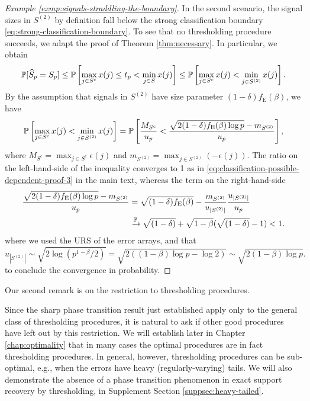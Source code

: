 \begin{example}
\begin{proof}[Example \ref{exmp:signals-straddling-the-boundary}]
In the second scenario, the signal sizes in $S^{(2)}$ by definition fall below the strong classification boundary \eqref{eq:strong-classification-boundary}.
To see that no thresholding procedure succeeds, we adapt the proof of Theorem \ref{thm:necessary}.
In particular, we obtain
$$
    \P[\widehat{S}_p = S_p] 
    \le \P\left[\max_{j\in S^c}x(j) \le t_p < \min_{j\in S}x(j)\right]
    \le \P\left[\max_{j\in S^c}x(j) < \min_{j\in S^{(2)}}x(j)\right].
$$
By the assumption that signals in $S^{(2)}$ have size parameter $(1-\delta)f_{\mathrm{E}}(\beta)$, we have
\begin{equation}
\P\left[\max_{j\in S^c}x(j) < \min_{j\in S^{(2)}}x(j)\right]
= \P\left[ \frac{M_{S^{c}}}{u_p} < \frac{\sqrt{2(1-\delta)f_{\mathrm{E}}(\beta)\log{p}} - m_{S^{(2)}}}{u_p}\right], 
\end{equation}
where $M_{S^{c}} = \max_{j\in S^{c}}\epsilon(j)$ and $m_{S^{(2)}} = \max_{j\in S^{(2)}}\left(-\epsilon(j)\right)$.
The ratio on the left-hand-side of the inequality converges to 1 as in \eqref{eq:classification-possible-dependent-proof-3} in the main text, whereas the term on the right-hand-side
\begin{align*}
    \frac{\sqrt{2(1-\delta)f_{\mathrm{E}}(\beta)\log{p}} - m_{S^{(2)}}}{u_p} 
    &= \sqrt{(1-\delta)f_{\mathrm{E}}(\beta)} - \frac{m_{S^{(2)}}}{u_{|S^{(2)}|}} \frac{u_{|S^{(2)}|}}{u_p} \\
    &\xrightarrow{\P} \sqrt{(1-\delta)} + \sqrt{1-\beta}(\sqrt{(1-\delta)} - 1) < 1.
\end{align*}
where we used the URS of the error arrays, and that 
$$
u_{|S^{(2)}|} \sim \sqrt{2\log{(p^{1-\beta}/2)}} 
= \sqrt{2(({1-\beta})\log{p}-\log2)} \sim \sqrt{2({1-\beta})\log{p}}.
$$
to conclude the convergence in probability.
\end{proof}
\end{example}

Our second remark is on the restriction to thresholding procedures.
\begin{remark}
	Since the sharp phase transition result just established apply only to the general class of thresholding procedures, it is natural to ask if other good procedures have left out by this restriction.
	We will establish later in Chapter \ref{chap:optimality} that in many cases the optimal procedures are in fact thresholding procedures. In general, however, thresholding procedures can be sub-optimal, e.g., when the errors have heavy (regularly-varying) tails. 
	We will also demonstrate the absence of a phase transition phenomenon in exact support recovery by thresholding, in Supplement Section \ref{suppsec:heavy-tailed}. 
\end{remark}

